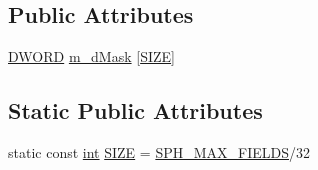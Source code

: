 \subsection*{Public Attributes}
\begin{DoxyCompactItemize}
\item 
\hyperlink{sphinxstd_8h_a798af1e30bc65f319c1a246cecf59e39}{D\-W\-O\-R\-D} \hyperlink{structFieldMask__t_a75ba3db9c43ddd577777791ea90c6c8b}{m\-\_\-d\-Mask} \mbox{[}\hyperlink{structFieldMask__t_ab709bd4f62ee319abda8f6a81578c67c}{S\-I\-Z\-E}\mbox{]}
\end{DoxyCompactItemize}
\subsection*{Static Public Attributes}
\begin{DoxyCompactItemize}
\item 
static const \hyperlink{sphinxexpr_8cpp_a4a26e8f9cb8b736e0c4cbf4d16de985e}{int} \hyperlink{structFieldMask__t_ab709bd4f62ee319abda8f6a81578c67c}{S\-I\-Z\-E} = \hyperlink{sphinx_8h_ad5336c1a92b4f76b012a1a868a85b874}{S\-P\-H\-\_\-\-M\-A\-X\-\_\-\-F\-I\-E\-L\-D\-S}/32
\end{DoxyCompactItemize}


